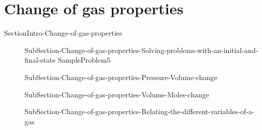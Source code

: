 \documentclass[main.tex]{subfiles}
\newcommand\chapterlabel{Ch-Gas}\setcounter{figurenewcounter}{0}\setcounter{tablenewcounter}{0}\setcounter{formulanewcounter}{0}
\begin{document}
 \section{Change of gas properties}{SectionIntro-Change-of-gas-properties}
\sloppy \begin{description}
\item[]  {SubSection-Change-of-gas-properties-Solving-problems-with-an-initial-and-final-state}
{SampleProblem5}
\item[]{SubSection-Change-of-gas-properties-Pressure-Volume-change}
 \item[] {SubSection-Change-of-gas-properties-Volume-Moles-change}
\item[]  {SubSection-Change-of-gas-properties-Relating-the-different-variables-of-a-gas}
\end{description}










 
\end{document}
